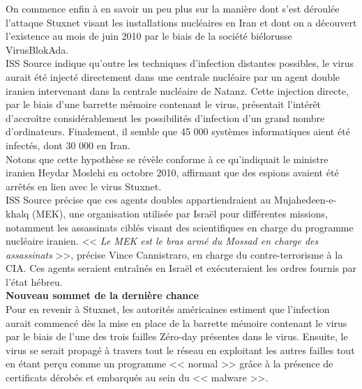 \documentclass[11pt,twoside,a4paper]{article}
\begin{document}
On commence enfin {\`a} en savoir un peu plus sur la mani{\`e}re dont s'est d{\'e}roul{\'e}e l'attaque Stuxnet visant les installations nucl{\'e}aires en Iran et dont on a d{\'e}couvert l'existence au mois de juin 2010 par le biais de la soci{\'e}t{\'e} bi{\'e}lorusse VirusBlokAda.~\\

ISS Source indique qu'outre les techniques d'infection distantes possibles, le virus aurait {\'e}t{\'e} inject{\'e} directement dans une centrale nucl{\'e}aire par un agent double iranien intervenant dans la centrale nucl{\'e}aire de Natanz. Cette injection directe, par le biais d'une barrette m{\'e}moire contenant le virus, pr{\'e}sentait l'int{\'e}r{\^e}t d'accro{\^i}tre consid{\'e}rablement les possibilit{\'e}s d'infection d'un grand nombre d'ordinateurs. Finalement, il semble que 45 000 syst{\`e}mes informatiques aient {\'e}t{\'e} infect{\'e}s, dont 30 000 en Iran.~\\

Notons que cette hypoth{\`e}se se r{\'e}v{\`e}le conforme {\`a} ce qu'indiquait le ministre iranien Heydar Moslehi  en octobre 2010, affirmant que des espions avaient {\'e}t{\'e} arr{\^e}t{\'e}s en lien avec le virus Stuxnet.~\\

ISS Source pr{\'e}cise que ces agents doubles appartiendraient au Mujahedeen-e-khalq (MEK), une organisation utilis{\'e}e par Isra{\"e}l pour diff{\'e}rentes missions, notamment les assassinats cibl{\'e}s visant des scientifiques en charge du programme nucl{\'e}aire iranien. << \emph{Le MEK est le bras arm{\'e} du Mossad en charge des assassinats} >>, pr{\'e}cise Vince Cannistraro, en charge du contre-terrorisme {\`a} la CIA. Ces agents seraient entra{\^i}n{\'e}s en Isra{\"e}l et ex{\'e}cuteraient les ordres fournis par l'{\'e}tat h{\'e}breu.~\\ 

\textbf{\large Nouveau sommet de la derni{\`e}re chance}~\\

Pour en revenir {\`a} Stuxnet, les autorit{\'e}s am{\'e}ricaines estiment que l'infection aurait commenc{\'e} d{\`e}s la mise en place de la barrette m{\'e}moire contenant le virus par le biais de l'une des trois failles Z{\'e}ro-day pr{\'e}sentes dans le virus. Ensuite, le virus se serait propag{\'e} {\`a} travers tout le r{\'e}seau en exploitant les autres failles tout en {\'e}tant per\c{c}u comme un programme << normal >> gr{\^a}ce {\`a} la pr{\'e}sence de certificats d{\'e}rob{\'e}s et embarqu{\'e}s au sein du << malware >>.~\\
\end{document}
